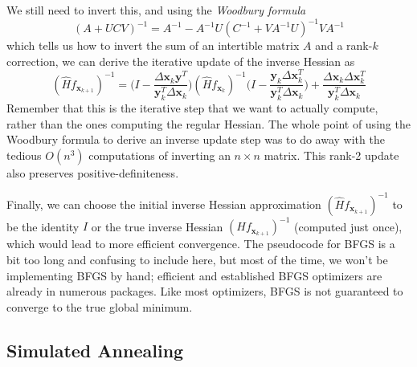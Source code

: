\documentclass{article}
\theoremstyle{remark}
\theoremstyle{definition}
\begin{document}
We still need to invert this, and using the \textit{Woodbury formula}
\[(A + U C V)^{-1} = A^{-1} - A^{-1} U (C^{-1} + V A^{-1} U)^{-1} V A^{-1}\]
which tells us how to invert the sum of an intertible matrix $A$ and a rank-$k$ correction, we can derive the iterative update of the inverse Hessian as 
\[(\hat{H} f_{\mathbf{x}_{k+1}})^{-1} = \bigg( I - \frac{\Delta \mathbf{x}_k \mathbf{y}^T}{\mathbf{y}_k^T \Delta \mathbf{x}_k}\bigg) (\hat{H} f_{\mathbf{x}_{k}})^{-1} \bigg( I - \frac{\mathbf{y}_k \Delta \mathbf{x}_k^T}{\mathbf{y}_k^T \Delta \mathbf{x}_k}\bigg) + \frac{\Delta \mathbf{x}_k \Delta \mathbf{x}_k^T}{\mathbf{y}_k^T \Delta \mathbf{x}_k}\]
Remember that this is the iterative step that we want to actually compute, rather than the ones computing the regular Hessian. The whole point of using the Woodbury formula to derive an inverse update step was to do away with the tedious $O(n^3)$ computations of inverting an $n \times n$ matrix. This rank-2 update also preserves positive-definiteness. 

Finally, we can choose the initial inverse Hessian approximation $(\hat{H} f_{\mathbf{x}_{k+1}})^{-1}$ to be the identity $I$ or the true inverse Hessian $(H f_{\mathbf{x}_{k+1}})^{-1}$ (computed just once), which would lead to more efficient convergence. The pseudocode for BFGS is a bit too long and confusing to include here, but most of the time, we won't be implementing BFGS by hand; efficient and established BFGS optimizers are already in numerous packages. Like most optimizers, BFGS is not guaranteed to converge to the true global minimum. 

\subsection{Simulated Annealing}
\end{document}

